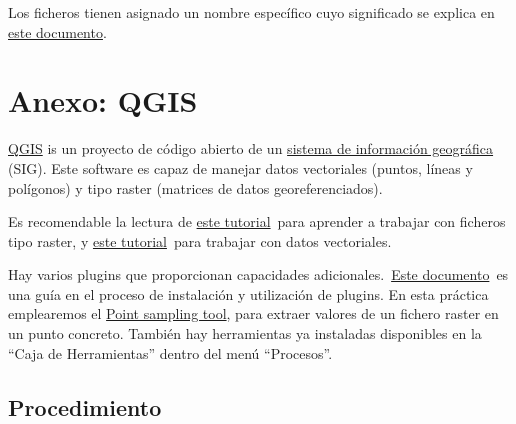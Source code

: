 \documentclass[11pt]{article}
\begin{document}
Los ficheros tienen asignado un nombre específico cuyo significado se explica en \href{https://www.cmsaf.eu/EN/Products/NamingConvention/download_NamingCconvention.pdf?__blob=publicationFile&v=6}{este documento}.

\section{Anexo: QGIS}
\label{sec:qgis}

\href{https://qgis.org/es/site/}{QGIS} is un proyecto de código
abierto de un
\href{https://es.wikipedia.org/wiki/Sistema\_de\_informaci\%C3\%B3n\_geogr\%C3\%A1fica}{sistema
  de información geográfica} (SIG). Este software es capaz de manejar
datos vectoriales (puntos, líneas y polígonos) y tipo raster (matrices
de datos georeferenciados).

Es recomendable la lectura de \href{https://docs.qgis.org/3.28/es/docs/user_manual/working_with_raster/index.html}{este
  tutorial} para aprender a trabajar con ficheros tipo raster, y
\href{http://docs.qgis.org/3.28/es/docs/user\_manual/working\_with\_vector/index.html}{este
  tutorial} para trabajar con datos vectoriales.

Hay varios plugins que proporcionan capacidades
adicionales. \href{https://docs.qgis.org/3.28/es/docs/training\_manual/qgis\_plugins/fetching\_plugins.html}{Este
  documento} es una guía en el proceso de instalación y utilización de
plugins. En esta práctica emplearemos el \href{https://plugins.qgis.org/plugins/pointsamplingtool/}{Point
    sampling tool}, para extraer valores de un fichero raster en un
  punto concreto.
  También hay herramientas ya instaladas disponibles en la ``Caja de Herramientas'' dentro del menú ``Procesos''.

\subsection*{Procedimiento}
\label{sec:orge72c353}
\end{document}
